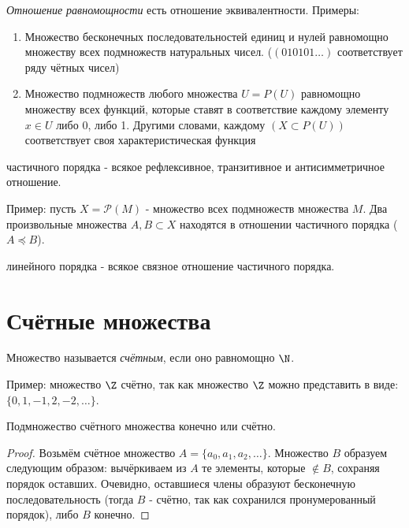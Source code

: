 \documentclass[a4paper, 14pt]{article}
\begin{document}
    {\it Отношение равномощности} есть отношение эквивалентности. Примеры: 
    \begin{enumerate}
        \item Множество бесконечных последовательностей единиц и нулей равномощно 
        множеству всех подмножеств натуральных чисел. ($(010101\dots)$ соответствует
        ряду чётных чисел)
        \item Множество подмножеств любого множества $U = P(U)$ равномощно
        множеству всех функций, которые ставят в соответствие каждому элементу
        $x \in U$ либо 0, либо 1. Другими словами, каждому $(X \subset P(U))$
        соответствует своя характеристическая функция
    \end{enumerate}
    \begin{definition}
        { частичного порядка} - всякое рефлексивное, транзитивное и
        антисимметричное отношение.
    \end{definition}
    Пример: пусть $X = \mathcal{P}(M)$ - множество всех подмножеств множества $M$.
    Два произвольные множества $A, B \subset X$ находятся в отношении частичного
    порядка ($A \preceq B$).

    \begin{definition}
        { линейного порядка} - всякое связное отношение частичного порядка.
    \end{definition}
    
    \section{Счётные множества}

    \begin{definition}
        Множество называется {\it счётным}, если оно равномощно $\N$.
    \end{definition}
    Пример: множество $\Z$ счётно, так как множество $\Z$ можно
    представить в виде: $\{0, 1, -1, 2, -2, \dots\}$.

    \begin{theorem}
        Подмножество счётного множества конечно или счётно.
    \end{theorem}
    \begin{proof}
        Возьмём счётное множество $A = \{a_0, a_1, a_2, \dots\}$.
        Множество $B$ образуем следующим образом: вычёркиваем из
        $A$ те элементы, которые $\notin B$, сохраняя порядок
        оставших. Очевидно, оставшиеся члены образуют бесконечную
        последовательность (тогда $B$ - счётно, так как сохранился
        пронумерованный порядок),  либо $B$ конечно.
    \end{proof}
    
\end{document}
